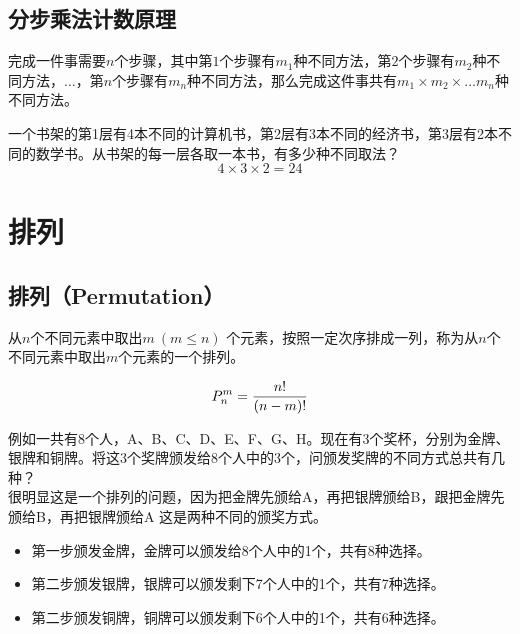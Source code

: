 \documentclass[12pt, openany, oneside]{book}
\begin{document}
\vspace{0.5cm}

\subsection{分步乘法计数原理}

完成一件事需要$ n $个步骤，其中第$ 1 $个步骤有$ m_1 $种不同方法，第$ 2 $个步骤有$ m_2 $种不同方法，$ \dots $，第$ n $个步骤有$ m_n $种不同方法，那么完成这件事共有$ m_1 \times m_2 \times \dots m_n $种不同方法。

\begin{tcolorbox}
	一个书架的第1层有4本不同的计算机书，第2层有3本不同的经济书，第3层有2本不同的数学书。从书架的每一层各取一本书，有多少种不同取法？
	$$
		4 \times 3 \times 2 = 24
	$$
\end{tcolorbox}

\newpage

\section{排列}

\subsection{排列（Permutation）}

从$ n $个不同元素中取出$ m\ (m \le n) $ 个元素，按照一定次序排成一列，称为从$ n $个不同元素中取出$ m $个元素的一个排列。

\vspace{-1cm}

\begin{align}
	P_n^m = {n! \over (n-m)!}
\end{align}

例如一共有8个人，A、B、C、D、E、F、G、H。现在有3个奖杯，分别为金牌、银牌和铜牌。将这3个奖牌颁发给8个人中的3个，问颁发奖牌的不同方式总共有几种？\\

很明显这是一个排列的问题，因为把金牌先颁给A，再把银牌颁给B，跟把金牌先颁给B，再把银牌颁给A 这是两种不同的颁奖方式。

\begin{itemize}
	\item 第一步颁发金牌，金牌可以颁发给8个人中的1个，共有8种选择。

	\item 第二步颁发银牌，银牌可以颁发剩下7个人中的1个，共有7种选择。

	\item 第二步颁发铜牌，铜牌可以颁发剩下6个人中的1个，共有6种选择。
\end{itemize}
\end{document}
